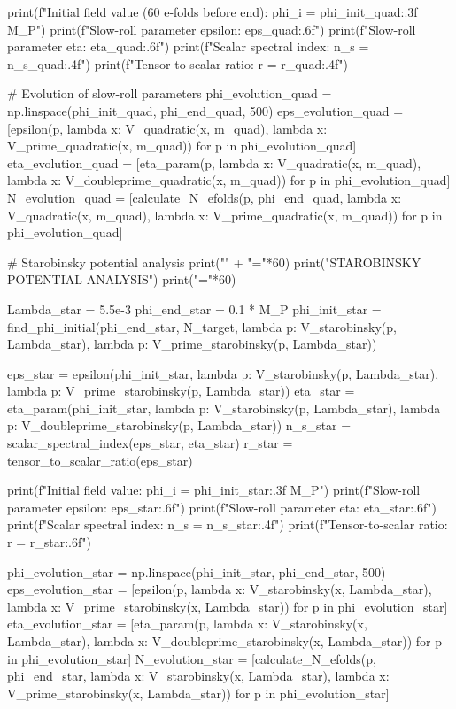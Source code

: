 \documentclass[a4paper, 11pt]{article}
\begin{document}
\begin{pycode}
print(f"Initial field value (60 e-folds before end): phi_i = {phi_init_quad:.3f} M_P")
print(f"Slow-roll parameter epsilon: {eps_quad:.6f}")
print(f"Slow-roll parameter eta: {eta_quad:.6f}")
print(f"Scalar spectral index: n_s = {n_s_quad:.4f}")
print(f"Tensor-to-scalar ratio: r = {r_quad:.4f}")

# Evolution of slow-roll parameters
phi_evolution_quad = np.linspace(phi_init_quad, phi_end_quad, 500)
eps_evolution_quad = [epsilon(p, lambda x: V_quadratic(x, m_quad),
                               lambda x: V_prime_quadratic(x, m_quad))
                       for p in phi_evolution_quad]
eta_evolution_quad = [eta_param(p, lambda x: V_quadratic(x, m_quad),
                                 lambda x: V_doubleprime_quadratic(x, m_quad))
                       for p in phi_evolution_quad]
N_evolution_quad = [calculate_N_efolds(p, phi_end_quad,
                                        lambda x: V_quadratic(x, m_quad),
                                        lambda x: V_prime_quadratic(x, m_quad))
                     for p in phi_evolution_quad]

# Starobinsky potential analysis
print("\n" + "="*60)
print("STAROBINSKY POTENTIAL ANALYSIS")
print("="*60)

Lambda_star = 5.5e-3
phi_end_star = 0.1 * M_P
phi_init_star = find_phi_initial(phi_end_star, N_target,
                                  lambda p: V_starobinsky(p, Lambda_star),
                                  lambda p: V_prime_starobinsky(p, Lambda_star))

eps_star = epsilon(phi_init_star,
                   lambda p: V_starobinsky(p, Lambda_star),
                   lambda p: V_prime_starobinsky(p, Lambda_star))
eta_star = eta_param(phi_init_star,
                      lambda p: V_starobinsky(p, Lambda_star),
                      lambda p: V_doubleprime_starobinsky(p, Lambda_star))
n_s_star = scalar_spectral_index(eps_star, eta_star)
r_star = tensor_to_scalar_ratio(eps_star)

print(f"Initial field value: phi_i = {phi_init_star:.3f} M_P")
print(f"Slow-roll parameter epsilon: {eps_star:.6f}")
print(f"Slow-roll parameter eta: {eta_star:.6f}")
print(f"Scalar spectral index: n_s = {n_s_star:.4f}")
print(f"Tensor-to-scalar ratio: r = {r_star:.6f}")

phi_evolution_star = np.linspace(phi_init_star, phi_end_star, 500)
eps_evolution_star = [epsilon(p, lambda x: V_starobinsky(x, Lambda_star),
                               lambda x: V_prime_starobinsky(x, Lambda_star))
                       for p in phi_evolution_star]
eta_evolution_star = [eta_param(p, lambda x: V_starobinsky(x, Lambda_star),
                                 lambda x: V_doubleprime_starobinsky(x, Lambda_star))
                       for p in phi_evolution_star]
N_evolution_star = [calculate_N_efolds(p, phi_end_star,
                                        lambda x: V_starobinsky(x, Lambda_star),
                                        lambda x: V_prime_starobinsky(x, Lambda_star))
                     for p in phi_evolution_star]


\end{pycode}
\end{document}
